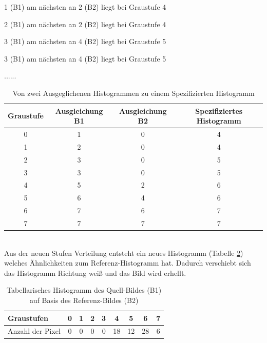   1 (B1) am nächsten an 2 (B2) liegt bei Graustufe 4
  
  2 (B1) am nächsten an 2 (B2) liegt bei Graustufe 4
  
  3 (B1) am nächsten an 4 (B2) liegt bei Graustufe 5
  
  3 (B1) am nächsten an 4 (B2) liegt bei Graustufe 5
  
  ......\\
  \begin{table}
  [h]
  \caption{Von zwei Ausgeglichenen Histogrammen zu einem Spezifizierten Histogramm}
  \label{tab:hs}
  \centering
  \begin{tabular}{|c|c|c|c|}
  \hline
  Graustufe & Ausgleichung B1 & Ausgleichung B2 & Spezifiziertes Histogramm\\
  \hline
  0 & 1 & 0 & 4\\
  \hline
  1 & 2 & 0 & 4\\
  \hline
  2 & 3 & 0 & 5\\
  \hline
  3 & 3 & 0 & 5\\
  \hline
  4 & 5 & 2 & 6\\
  \hline
  5 & 6 & 4 & 6\\
  \hline
  6 & 7 & 6 & 7\\
  \hline
  7 & 7 & 7 & 7\\
  \hline
  \end{tabular}
  \end{table}\\
Aus der neuen Stufen Verteilung entsteht ein neues Histogramm (Tabelle \ref{tab:B3}) welches Ähnlichkeiten zum Referenz-Histogramm hat. Dadurch verschiebt sich das Histogramm Richtung weiß und das Bild wird erhellt.
  \begin{table}
  [h]
  \caption{Tabellarisches Histogramm des Quell-Bildes (B1) auf Basis des Referenz-Bildes (B2)}
  \label{tab:B3}
  \centering
  \begin{tabular}{|l|c|c|c|c|c|c|c|c|}
  \hline
  Graustufen & 0 & 1 & 2 & 3 & 4 & 5 & 6 & 7\\
  \hline
  Anzahl der Pixel & 0 & 0 & 0 & 0 & 18 & 12 & 28 & 6\\
  \hline
  \end{tabular}
  \end{table}